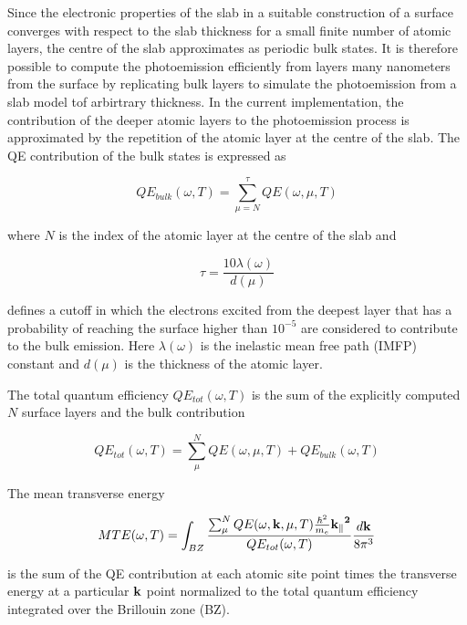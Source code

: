 \documentclass[a4paper,11pt,twoside]{book}
\begin{document}
Since the electronic properties of the slab in a suitable construction of a surface converges with respect to the slab thickness for a small finite number of atomic layers, the centre of the slab approximates as periodic bulk states. It is therefore possible to compute the photoemission efficiently from layers many nanometers from the surface by replicating bulk layers to simulate the photoemission from a slab model tof arbirtrary thickness. In the current implementation, the contribution of the deeper atomic layers to the photoemission process is approximated by the repetition of the atomic layer at the centre of the slab. The QE contribution of the bulk states is expressed as

\begin{equation}
QE_{bulk}(\omega,T) = \sum^{\tau}_{\mu = N} QE(\omega,\mu,T)
    \label{QE_bulk}
\end{equation}

where $N$ is the index of the atomic layer at the centre of the slab and 

\begin{equation}
\tau = \frac{10\lambda(\omega)}{d(\mu)}
    \label{QE_bulk}
\end{equation}

defines a cutoff in which the electrons excited from the deepest layer that has a probability of reaching the surface higher than $10^{-5}$ are considered to contribute to the bulk emission. Here $\lambda(\omega)$ is the inelastic mean free path (IMFP) constant and $d(\mu)$ is the thickness of the atomic layer.

The total quantum efficiency $QE_{tot}{( \omega, T)}$ is the sum of the explicitly computed $N$ surface layers and the bulk contribution

\begin{equation}
QE_{tot}( \omega , T)= \sum_{\mu}^N  QE{( \omega ,\mu, T)} + QE_{bulk}(\omega,T)
    \label{total_qe}
\end{equation}

The mean transverse energy 

\begin{equation}
MTE(\omega, T) =\int_{BZ} \frac{\sum_{\mu}^N{QE(\omega,{\bf{k}},\mu, T)}\frac{\hbar^2}{m_e}\bf{k_{\parallel}}^2}{QE_{tot}( \omega , T)} \frac{d{\bf{k}}}{8\pi^3}
    \label{total_qe}
\end{equation}

is the sum of the QE contribution at each atomic site point times the transverse energy at a particular $\bf{k}$ point normalized to the total quantum efficiency integrated over the Brillouin zone (BZ).
\end{document}
